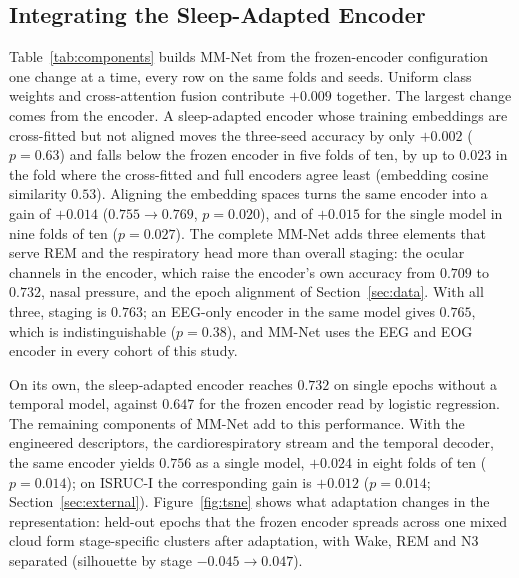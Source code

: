 \documentclass[a4paper,fleqn]{cas-sc}
\newcommand{\mmAcc}{0.763}
\newcommand{\mmAccS}{0.756}
\begin{document}
\subsection{Integrating the Sleep-Adapted Encoder}
\label{sec:integration}
Table~\ref{tab:components} builds MM-Net from the frozen-encoder configuration one change at a
time, every row on the same folds and seeds. Uniform class weights and cross-attention fusion
contribute $+0.009$ together. The largest change comes from the encoder. A sleep-adapted encoder whose
training embeddings are cross-fitted but not aligned moves the three-seed accuracy by only
$+0.002$ ($p=0.63$) and falls below the frozen encoder in five folds of ten, by up to $0.023$ in
the fold where the cross-fitted and full encoders agree least (embedding cosine similarity
$0.53$). Aligning the embedding spaces turns the same encoder into a gain of $+0.014$
($0.755\rightarrow0.769$, $p=0.020$), and of $+0.015$ for the single model in nine folds of ten
($p=0.027$). The complete MM-Net adds three elements that serve REM and the respiratory head more than overall staging: the ocular channels in the encoder, which raise the encoder's own accuracy from $0.709$ to $0.732$, nasal pressure, and the epoch alignment of Section~\ref{sec:data}. With all three, staging is $\mmAcc$; an EEG-only encoder in the same model
gives $0.765$, which is indistinguishable ($p=0.38$), and MM-Net uses the EEG and EOG encoder in
every cohort of this study.

On its own, the sleep-adapted encoder reaches $0.732$ on single epochs without a temporal model, against $0.647$ for the frozen encoder read by logistic regression.
The remaining components of MM-Net add to this performance. With the engineered descriptors, the
cardiorespiratory stream and the temporal decoder, the same encoder yields $\mmAccS$ as a single
model, $+0.024$ in eight folds of ten ($p=0.014$); on ISRUC-I the corresponding gain is $+0.012$
($p=0.014$; Section~\ref{sec:external}). Figure~\ref{fig:tsne} shows what adaptation changes in
the representation: held-out epochs that the frozen encoder spreads across one mixed cloud
form stage-specific clusters after adaptation, with Wake, REM and N3 separated (silhouette by
stage $-0.045\rightarrow0.047$).
\end{document}
